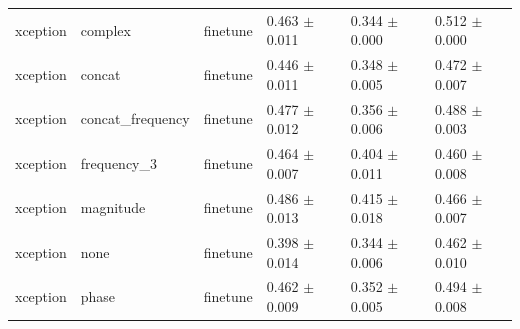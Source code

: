 \begin{table}
\begin{tabular}{llllll}
xception & complex & finetune & 0.463 $\pm$ 0.011 & 0.344 $\pm$ 0.000 & 0.512 $\pm$ 0.000 \\
xception & concat & finetune & 0.446 $\pm$ 0.011 & 0.348 $\pm$ 0.005 & 0.472 $\pm$ 0.007 \\
xception & concat_frequency & finetune & 0.477 $\pm$ 0.012 & 0.356 $\pm$ 0.006 & 0.488 $\pm$ 0.003 \\
xception & frequency_3 & finetune & 0.464 $\pm$ 0.007 & 0.404 $\pm$ 0.011 & 0.460 $\pm$ 0.008 \\
xception & magnitude & finetune & 0.486 $\pm$ 0.013 & 0.415 $\pm$ 0.018 & 0.466 $\pm$ 0.007 \\
xception & none & finetune & 0.398 $\pm$ 0.014 & 0.344 $\pm$ 0.006 & 0.462 $\pm$ 0.010 \\
xception & phase & finetune & 0.462 $\pm$ 0.009 & 0.352 $\pm$ 0.005 & 0.494 $\pm$ 0.008 \\
\bottomrule
\end{tabular}
\end{table}
